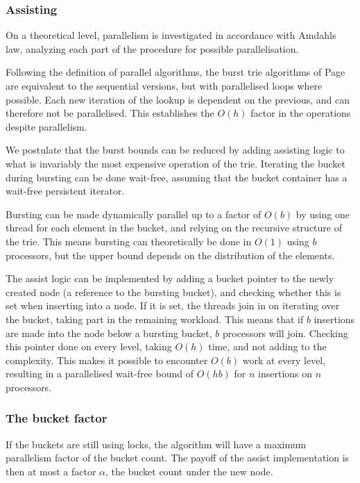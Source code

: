 \subsubsection{Assisting}
On a theoretical level, parallelism is investigated in accordance with Amdahls
law, analyzing each part of the procedure for possible parallelisation.

Following the definition of parallel algorithms, the burst trie algorithms of
Page \pageref{alg:bt_insert} are equivalent to the sequential versions, but
with parallelised loops where possible. Each new iteration of the lookup
is dependent on the previous, and can therefore not be parallelised. This
establishes the $O(h)$ factor in the operations despite parallelism.

We postulate that the burst bounds can be reduced by adding assisting logic to
what is invariably the most expensive operation of the trie. Iterating the
bucket during bursting can be done wait-free, assuming that the bucket
container has a wait-free persistent iterator.

Bursting can be made dynamically parallel up to a factor of $O(b)$ by
using one thread for each element in the bucket, and relying on the recursive
structure of the trie. This means bursting can theoretically be done in
$O(1)$ using $b$ processors, but the upper bound depends on the
distribution of the elements.

The assist logic can be implemented by adding a bucket pointer to the
newly created node (a reference to the bursting bucket), and checking whether
this is set when inserting into a node. If it is set, the threads join
in on iterating over the bucket, taking part in the remaining workload.
This means that if $b$ insertions are made into the node
below a bursting bucket, $b$ processors will join. Checking this pointer
done on every level, taking $O(h)$ time, and not adding to the complexity.
This makes it possible to encounter
$O(b)$ work at every level, resulting in a parallelised wait-free
bound of $O(hb)$ for $n$ insertions on $n$ processors.

\subsubsection{The bucket factor}
If the buckets are still using locks, the algorithm will have a maximum
parallelism factor of the bucket count. The payoff of the assist implementation
is then at most a factor $\alpha$, the bucket count under the new node.

